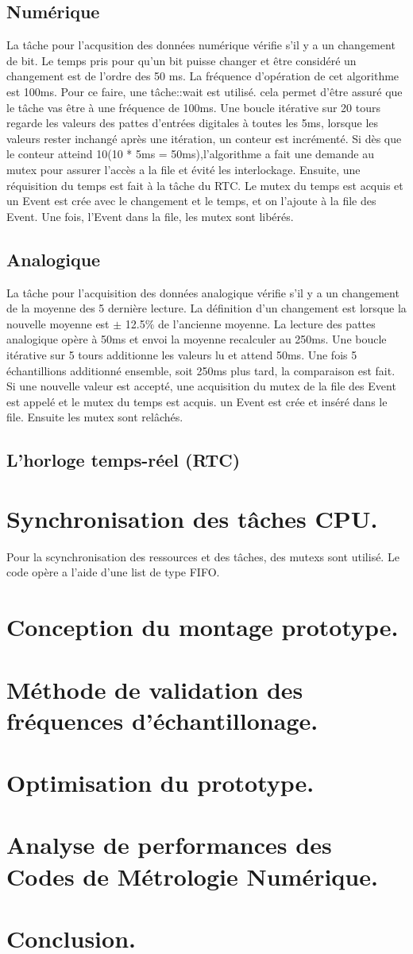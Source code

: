\documentclass[12pt]{article}
\begin{document}
\subsection{Numérique}
La tâche pour l'acqusition des données numérique vérifie s'il y a un changement de bit. Le temps pris pour qu'un bit puisse changer et être considéré un changement est de l'ordre des 50 ms. La fréquence d'opération de cet algorithme est 100ms. Pour ce faire, une tâche::wait est utilisé. cela permet d'être assuré que le tâche vas être à une fréquence de 100ms. Une boucle itérative sur 20 tours regarde les valeurs des pattes d'entrées digitales à toutes les 5ms, lorsque les valeurs rester inchangé après une itération, un conteur est incrémenté. Si dès que le conteur atteind 10(10 * 5ms = 50ms),l'algorithme a fait une demande au mutex pour assurer l'accès a la file et évité les interlockage. Ensuite, une réquisition du temps est fait à la tâche du RTC. Le mutex du temps est acquis et un Event est crée avec le changement et le temps, et on l'ajoute à la file des Event. Une fois, l'Event dans la file, les mutex sont libérés.

\subsection{Analogique}
La tâche pour l'acquisition des données analogique vérifie s'il y a un changement de la moyenne des 5 dernière lecture. La définition d'un changement est lorsque la nouvelle moyenne est $\pm$ 12.5$\%$ de l'ancienne moyenne. La lecture des pattes analogique opère à 50ms et envoi la moyenne recalculer au 250ms. Une boucle itérative sur 5 tours additionne les valeurs lu et attend 50ms. Une fois 5 échantillions additionné ensemble, soit 250ms plus tard, la comparaison est fait. Si une nouvelle valeur est accepté, une acquisition du mutex de la file des Event est appelé et le mutex du temps est acquis. un Event est crée et inséré dans le file. Ensuite les mutex sont relâchés. 

\subsection{L'horloge temps-réel (RTC)}

\section{Synchronisation des tâches CPU.}
Pour la scynchronisation des ressources et des tâches, des mutexs sont utilisé. Le code opère a l'aide d'une list de type FIFO.
\section{Conception du montage prototype.}
\section{Méthode de validation des fréquences d'échantillonage.}
\section{Optimisation du prototype.}
\section{Analyse de performances des Codes de Métrologie Numérique.}
\section{Conclusion.}
\end{document}
